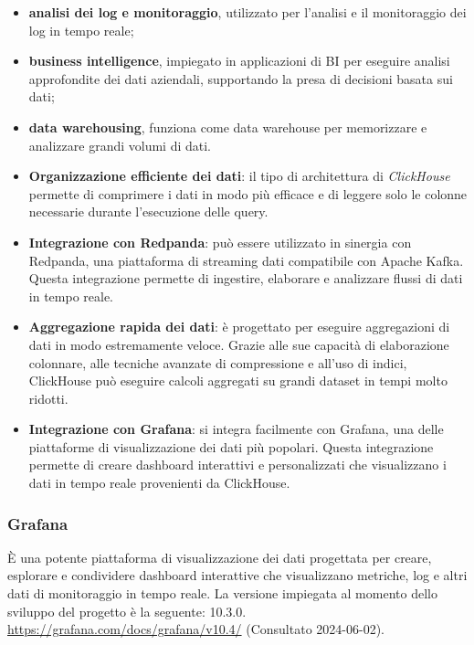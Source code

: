 \begin{itemize}
        \item \textbf{analisi dei log e monitoraggio}, utilizzato per l'analisi e il monitoraggio dei log in tempo reale;
        \item \textbf{business intelligence}, impiegato in applicazioni di BI per eseguire analisi approfondite dei dati aziendali, supportando la presa di decisioni basata sui dati;
        \item \textbf{data warehousing}, funziona come data warehouse per memorizzare e analizzare grandi volumi di dati.
\end{itemize}
\begin{itemize}
    \item \textbf{Organizzazione efficiente dei dati}: il tipo di architettura di \textit{ClickHouse} permette di comprimere i dati in modo più efficace e di leggere solo le colonne necessarie durante l'esecuzione delle query. 
    \item \textbf{Integrazione con Redpanda}: può essere utilizzato in sinergia con Redpanda, una piattaforma di streaming dati compatibile con Apache Kafka. Questa integrazione permette di ingestire, elaborare e analizzare flussi di dati in tempo reale. 
	\item \textbf{Aggregazione rapida dei dati}: è progettato per eseguire aggregazioni di dati in modo estremamente veloce. Grazie alle sue capacità di elaborazione colonnare, alle tecniche avanzate di compressione e all'uso di indici, ClickHouse può eseguire calcoli aggregati su grandi dataset in tempi molto ridotti. 
	\item \textbf{Integrazione con Grafana}: si integra facilmente con Grafana, una delle piattaforme di visualizzazione dei dati più popolari. Questa integrazione permette di creare dashboard interattivi e personalizzati che visualizzano i dati in tempo reale provenienti da ClickHouse. 
\end{itemize}

\subsubsection{Grafana}
È una potente piattaforma di visualizzazione dei dati progettata per creare, esplorare e condividere dashboard interattive che visualizzano metriche, log e altri dati di monitoraggio in tempo reale.
La versione impiegata al momento dello sviluppo del progetto è la seguente: 10.3.0.
\url{https://grafana.com/docs/grafana/v10.4/} (Consultato 2024-06-02).

